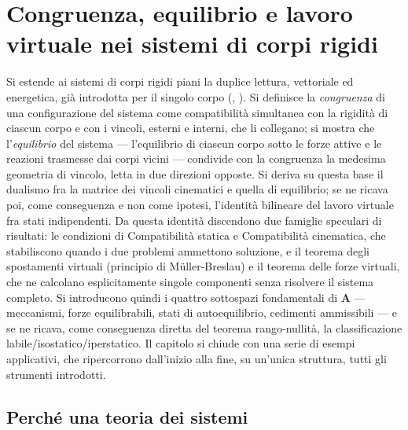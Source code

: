\graphicspath{{Parti/P03-Meccanica_SR/C05-Problemi_CinStat_SCR/Figure/}}
\chapter{Congruenza, equilibrio e lavoro virtuale nei sistemi di corpi rigidi}\label{cap:SCR}

\begin{sommario}
	Si estende ai sistemi di corpi rigidi piani la duplice lettura,
	vettoriale ed energetica, già introdotta per il singolo corpo
	(, ).
	Si definisce la \emph{congruenza} di una configurazione del sistema
	come compatibilità simultanea con la rigidità di ciascun corpo e con
	i vincoli, esterni e interni, che li collegano; si mostra che
	l'\emph{equilibrio} del sistema — l'equilibrio di ciascun corpo sotto
	le forze attive e le reazioni trasmesse dai corpi vicini — condivide
	con la congruenza la medesima geometria di vincolo, letta in due
	direzioni opposte. Si deriva su questa base il dualismo fra la matrice dei vincoli cinematici e quella
	di equilibrio; se ne ricava poi, come conseguenza e non come ipotesi,
	l'identità bilineare del lavoro virtuale fra stati indipendenti. Da
	questa identità discendono due famiglie speculari di risultati: le
	condizioni di Compatibilità statica e Compatibilità cinematica, che
	stabiliscono quando i due problemi ammettono soluzione, e il teorema
	degli spostamenti virtuali (principio di Müller-Breslau) e il teorema
	delle forze virtuali, che ne calcolano
	esplicitamente singole componenti senza risolvere il sistema completo.
	Si introducono quindi i quattro sottospazi fondamentali di $\bm A$ —
	meccanismi, forze equilibrabili, stati di autoequilibrio, cedimenti
	ammissibili — e se ne ricava, come conseguenza diretta del teorema
	rango-nullità, la classificazione labile/isostatico/iperstatico. Il
	capitolo si chiude con una serie di esempi applicativi, che
	ripercorrono dall'inizio alla fine, su un'unica struttura, tutti gli
	strumenti introdotti.
\end{sommario}


\section{Perché una teoria dei sistemi}\label{sec:motivazione_SCR}

